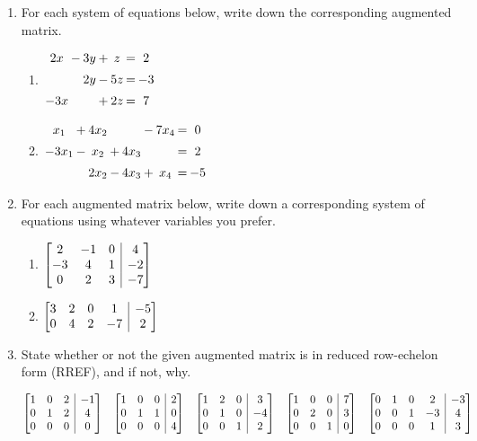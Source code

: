 \documentclass[12pt]{article}
\makeatletter
\newenvironment{amatrix}[1]{%
  \left[\begin{array}{@{}*{#1}{c}|c@{}}
}{%
  \end{array}\right]
}
\newcommand{\bam}{\begin{amatrix}}
\newcommand{\eam}{\end{amatrix}}
\makeatother
\begin{document}

 \begin{enumerate}
\item For each system of equations below, write down the corresponding augmented matrix.
\begin{multicols}{2}
\begin{enumerate}
 \item $\arraycolsep=1pt\begin{array}{ccccccc}2x&-&3y&+&z&=&2\\[5pt] & &2y&-&5z&=&-3\\[5pt] -3x& & &+&2z&=&7\end{array}$



 \item $\arraycolsep=1pt\begin{array}{ccccccccc}x_1&+&4x_2& & &-&7x_4&=&0\\[5pt]-3x_1&-&x_2&+&4x_3& & &=&2\\[5pt] & &2x_2&-&4x_3&+&x_4&=&-5\end{array}$
 \end{enumerate}
\end{multicols}


\vspace{3.5cm}


\item For each augmented matrix below, write down a corresponding system of equations using whatever variables you prefer.
\begin{multicols}{2}
\begin{enumerate}
 \item $\bam{3}2&-1&0&4\\-3&4&1&-2\\0&2&3&-7\eam$



 \item $\bam{4}3&2&0&1&-5\\0&4&2&-7&2\eam$
\end{enumerate}
\end{multicols}

\vspace{4cm}

\item State whether or not the given augmented matrix is in reduced row-echelon form (RREF), and if not, why.

\[
 \bam{3}1&0&2&-1\\0&1&2&4\\0&0&0&0\eam \quad \bam{3}1&0&0&2\\0&1&1&0\\0&0&0&4\eam \quad \bam{3}1&2&0&3\\0&1&0&-4\\0&0&1&2\eam \quad \bam{3}1&0&0&7\\0&2&0&3\\0&0&1&0\eam 
\quad \bam{4}0&1&0&2&-3\\0&0&1&-3&4\\0&0&0&1&3\eam
\]


\end{enumerate}
\end{document}

